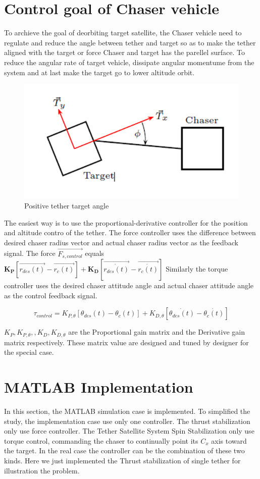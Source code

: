 \section{Control goal of Chaser vehicle}
To archieve the goal of deorbiting target satellite, the Chaser vehicle need to regulate and reduce the angle between tether and target so as to make the tether aligned with the target or force Chaser and target has the parellel surface. To reduce the angular rate of target vehicle, dissipate angular momentume from the system and at last make the target go to lower altitude orbit.
\begin{figure}
\centering
\includegraphics{fig/simulation/TetherTargetAngle}
\caption{Positive tether target angle}
\end{figure}
The easiest way is to use the proportional-derivative controller for the position and altitude contro of the tether.
The force controller uses the difference between desired chaser radius vector and actual chaser radius vector as the feedback signal. The force $\overrightarrow{F_{s,control}}$ equals $\mathbf{K_P}\left[\overrightarrow{r_{des}(t)}-\overrightarrow{r_c(t)}\right]+\mathbf{K_D}\left[\overrightarrow{\dot{r_{des}(t)}}-\overrightarrow{\dot{r_c(t)}}\right]$
Similarly the torque controller uses the desired chaser attitude angle and actual chaser attitude angle as the control feedback signal.

$$\tau_{control} =K_{P,\theta}\left[\theta_{des}(t)-\theta_c(t)\right] + K_{D,\theta}\left[\dot{\theta_{des}(t)}-\dot{\theta_c(t)}\right]$$

$K_P,K_{P,\theta},, K_D,K_{D,\theta}$ are the Proportional gain matrix and the Derivative gain matrix respectively. These matrix value are designed and tuned by designer for the special case.

\section{MATLAB Implementation}
In this section, the MATLAB simulation case is implemented. To simplified the study, the implementation case use only one controller. The thrust stabilization only use force controller. The Tether Satellite System Spin Stabilization only use torque control, commanding the chaser to continually point its $C_x$  axis toward the target. In the real case the controller can be the combination of these two kinds. Here we just implemented the Thrust stabilization of single tether for illustration the problem.

